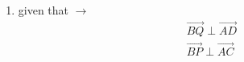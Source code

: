 \begin{enumerate}[label=\thesection.\arabic*.,ref=\thesection.\theenumi]
	
\item 	given that $\to$
\begin{align}
\vec{BQ} \perp \vec{AD}\\
\vec{BP} \perp \vec{AC}	
\end{align}
\end{enumerate}
